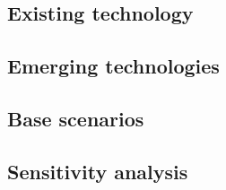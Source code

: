 \subsection{Existing technology}

\subsection{Emerging technologies}

\subsection{Base scenarios}
\subsection{Sensitivity analysis}

